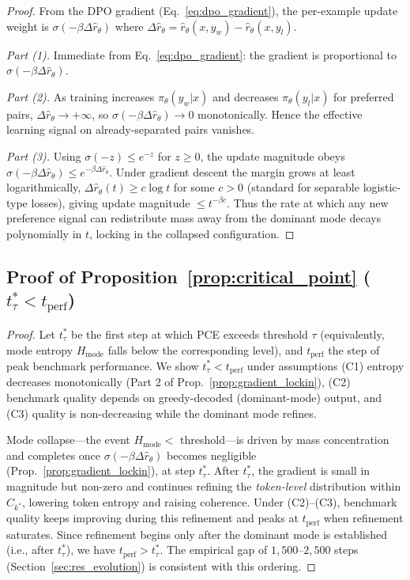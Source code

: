 \begin{proof}
From the DPO gradient (Eq.~\ref{eq:dpo_gradient}), the per-example update weight is $\sigma(-\beta \Delta\hat{r}_\theta)$ where $\Delta\hat{r}_\theta = \hat{r}_\theta(x,y_w) - \hat{r}_\theta(x,y_l)$.

\emph{Part (1).} Immediate from Eq.~\eqref{eq:dpo_gradient}: the gradient is proportional to $\sigma(-\beta\Delta\hat{r}_\theta)$.

\emph{Part (2).} As training increases $\pi_\theta(y_w|x)$ and decreases $\pi_\theta(y_l|x)$ for preferred pairs, $\Delta\hat{r}_\theta \to +\infty$, so $\sigma(-\beta\Delta\hat{r}_\theta)\to 0$ monotonically. Hence the effective learning signal on already-separated pairs vanishes.

\emph{Part (3).} Using $\sigma(-z)\leq e^{-z}$ for $z\geq 0$, the update magnitude obeys $\sigma(-\beta\Delta\hat{r}_\theta)\leq e^{-\beta\Delta\hat{r}_\theta}$. Under gradient descent the margin grows at least logarithmically, $\Delta\hat{r}_\theta(t)\geq c\log t$ for some $c>0$ (standard for separable logistic-type losses), giving update magnitude $\leq t^{-\beta c}$. Thus the rate at which any new preference signal can redistribute mass away from the dominant mode decays polynomially in $t$, locking in the collapsed configuration.
\end{proof}

\subsection{Proof of Proposition~\ref{prop:critical_point} ($t^*_\tau < t_{\text{perf}}$)}

\begin{proof}
Let $t^*_\tau$ be the first step at which PCE exceeds threshold $\tau$ (equivalently, mode entropy $H_{\text{mode}}$ falls below the corresponding level), and $t_{\text{perf}}$ the step of peak benchmark performance. We show $t^*_\tau < t_{\text{perf}}$ under assumptions (C1) entropy decreases monotonically (Part 2 of Prop.~\ref{prop:gradient_lockin}), (C2) benchmark quality depends on greedy-decoded (dominant-mode) output, and (C3) quality is non-decreasing while the dominant mode refines.

Mode collapse---the event $H_{\text{mode}} < $ threshold---is driven by mass concentration and completes once $\sigma(-\beta\Delta\hat{r}_\theta)$ becomes negligible (Prop.~\ref{prop:gradient_lockin}), at step $t^*_\tau$. After $t^*_\tau$, the gradient is small in magnitude but non-zero and continues refining the \emph{token-level} distribution within $C_{k^*}$, lowering token entropy and raising coherence. Under (C2)--(C3), benchmark quality keeps improving during this refinement and peaks at $t_{\text{perf}}$ when refinement saturates. Since refinement begins only after the dominant mode is established (i.e., after $t^*_\tau$), we have $t_{\text{perf}} > t^*_\tau$. The empirical gap of $1{,}500$--$2{,}500$ steps (Section~\ref{sec:res_evolution}) is consistent with this ordering.
\end{proof}


